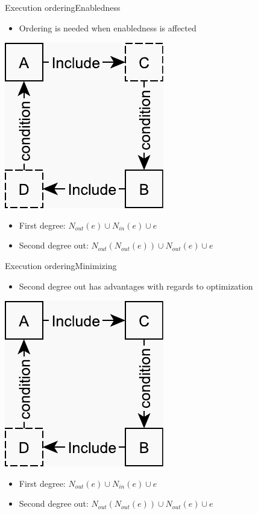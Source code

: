 \documentclass{beamer}
\begin{document}
\begin{frame}{Execution ordering}{Enabledness}%
	\begin{itemize}
		\item Ordering is needed when enabledness is affected
	\end{itemize}
	\vspace{\fill}
	\centering
    \includegraphics[scale=0.5]{figures/second-degree-effect.pdf}
    \vspace{\fill}
    \begin{itemize}
    	\item First degree: $N_{out}(e) \cup N_{in}(e) \cup e$
    	\item Second degree out: $N_{out}(N_{out}(e)) \cup N_{out}(e) \cup e$
    \end{itemize}
\end{frame}

\begin{frame}{Execution ordering}{Minimizing}%
	\begin{itemize}
		\item Second degree out has advantages with regards to optimization
	\end{itemize}
	\vspace{\fill}
	\centering
    \includegraphics[scale=0.5]{figures/second-degree-no-effect.pdf}
    \vspace{\fill}
    \begin{itemize}
    	\item First degree: $N_{out}(e) \cup N_{in}(e) \cup e$
    	\item Second degree out: $N_{out}(N_{out}(e)) \cup N_{out}(e) \cup e$
    \end{itemize}
\end{frame}
\end{document}

